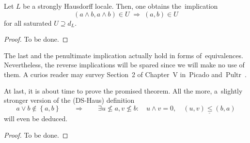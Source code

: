 \begin{lem} \label{meets-in-satur}
  Let $L$ be a strongly Hausdorff locale.
  Then, one obtains the~implication
  \[
    \left( a \wedge b, a \wedge b \right) \in U
    \; \Rightarrow \;
    \left( a, b \right) \in U
  \]
  for all saturated $U \supseteq d_L$.
\end{lem}
\begin{proof}
  To be done.
\end{proof}

\begin{rem}
  The last and the penultimate implication actually hold in forms
  of~equivalences.
  Nevertheless, the reverse implications will be spared since we will make no
  use of them.
  A curios reader may survey Section~2 of Chapter~V in~Picado
  and~Pultr~\cite{picado-pultr12}.
\end{rem}

At last, it is about time to prove the promised theorem.
All the more, a~slightly stronger version of the (DS-Haus) definition
\[
  a \vee b \not\in \left\{a, b\right\} \qquad \Rightarrow \qquad \exists
  u\not\leq a, v\not\leq b: \quad u \wedge v = 0, \quad \underline{\left(u,
  v\right) \leq \left(b, a\right)}
\]
will even be deduced.

\begin{proof}
  To be done.
\end{proof}
